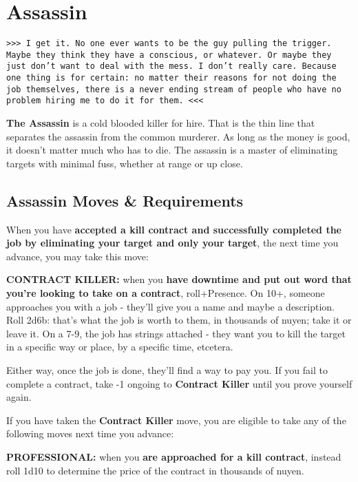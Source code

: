 \documentclass[oneside,10pt]{article}
\begin{document}
\newpage

\section{Assassin}
\begin{multicols}{2}


\texttt{>>> I get it. No one ever wants to be the guy pulling the trigger. Maybe they think they have a conscious, or whatever. Or maybe they just don't want to deal with the mess. I don't really care. Because one thing is for certain: no matter their reasons for not doing the job themselves, there is a never ending stream of people who have no problem hiring me to do it for them. <<<}

\textbf{The Assassin} is a cold blooded killer for hire. That is the thin line that separates the assassin from the common murderer. As long as the money is good, it doesn't matter much who has to die. The assassin is a master of eliminating targets with minimal fuss, whether at range or up close. 

\subsection{Assassin Moves \& Requirements}

When you have \textbf{accepted a kill contract and successfully completed the job by eliminating your target and only your target}, the next time you advance, you may take this move:

\textbf{CONTRACT KILLER:} when you \textbf{have downtime and put out word that you’re looking to take on a contract}, roll+Presence. On 10+, someone approaches you with a job - they’ll give you a name and maybe a description. Roll 2d6b: that’s what the job is worth to them, in thousands of nuyen; take it or leave it. On a 7-9, the job has strings attached - they want you to kill the target in a specific way or place, by a specific time, etcetera.

 Either way, once the job is done, they'll find a way to pay you. If you fail to complete a contract, take -1 ongoing to \textbf{Contract Killer} until you prove yourself again.

If you have taken the \textbf{Contract Killer}
move, you are eligible to take any of the
following moves next time you advance:

\textbf{PROFESSIONAL:} when you \textbf{are
  approached for a kill contract}, instead roll
1d10 to determine the price of the contract in
thousands of nuyen. 


\end{multicols}
\end{document}
